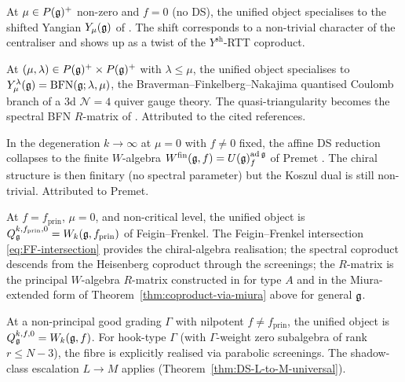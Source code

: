 \begin{proposition}
\label{prop:fibre-shifted-yangian}
\ClaimStatusProvedHere
At $\mu \in P(\mathfrak{g})^{+}$ non-zero and $f = 0$ (no DS), the unified
object specialises to the shifted Yangian $Y_{\mu}(\mathfrak{g})$ of
\cite{BrundanKleshchev06,KamnitzerTappeWeekes14}. The shift
corresponds to a non-trivial character of the centraliser and shows up
as a twist of the $Y^{\mathrm{sh}}$-RTT coproduct.
\end{proposition}

\begin{proposition}
\label{prop:fibre-bfn}
\ClaimStatusProvedElsewhere
At $(\mu, \lambda)\in P(\mathfrak{g})^{+}\times P(\mathfrak{g})^{+}$ with
$\lambda\le \mu$, the unified object specialises to
$Y^{\lambda}_{\mu}(\mathfrak{g}) = \mathrm{BFN}(\mathfrak{g}; \lambda, \mu)$, the
Braverman--Finkelberg--Nakajima \cite{BFN19a} quantised Coulomb
branch of a 3d $\mathcal{N}=4$ quiver gauge theory. The
quasi-triangularity becomes the spectral BFN $R$-matrix of
\cite{FinkelbergTsymbaliuk20}. Attributed to the cited references.
\end{proposition}

\begin{proposition}
\label{prop:fibre-finite-W}
\ClaimStatusProvedElsewhere
In the degeneration $k\to\infty$ at $\mu = 0$ with $f\neq 0$ fixed, the
affine DS reduction collapses to the finite $W$-algebra
$W^{\mathrm{fin}}(\mathfrak{g}, f) = U(\mathfrak{g})^{\mathrm{ad}\,\mathfrak{g}}_{f}$ of Premet
\cite{Premet02}. The chiral structure is then finitary
(no spectral parameter) but the Koszul dual is still non-trivial.
Attributed to Premet.
\end{proposition}

\begin{proposition}
\label{prop:fibre-principal-W}
\ClaimStatusProvedHere
At $f = f_{\mathrm{prin}}$, $\mu = 0$, and non-critical level, the
unified object is $Q_{\mathfrak{g}}^{k,f_{\mathrm{prin}},0} =
W_k(\mathfrak{g}, f_{\mathrm{prin}})$ of Feigin--Frenkel. The Feigin--Frenkel
intersection \eqref{eq:FF-intersection} provides the chiral-algebra
realisation; the spectral coproduct descends from the Heisenberg
coproduct through the screenings; the $R$-matrix is the principal
$W$-algebra $R$-matrix constructed in
\cite[Theorem 6.2]{JindalKaubrysLatyntsev26} for type $A$ and in the
Miura-extended form of Theorem~\ref{thm:coproduct-via-miura} above for
general $\mathfrak{g}$.
\end{proposition}

\begin{proposition}
\label{prop:fibre-nonprincipal-W}
\ClaimStatusProvedHere
At a non-principal good grading $\Gamma$ with nilpotent $f\neq
f_{\mathrm{prin}}$, the unified object is
$Q_{\mathfrak{g}}^{k,f,0} = W_k(\mathfrak{g}, f)$. For hook-type $\Gamma$
(with $\Gamma$-weight zero subalgebra of rank $r\le N-3$), the fibre
is explicitly realised via \cite{KacRoanWakimoto03, Ara07}
parabolic screenings. The shadow-class escalation $L\to M$ applies
(Theorem~\ref{thm:DS-L-to-M-universal}).
\end{proposition}

